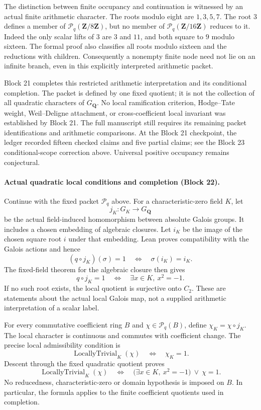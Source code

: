 \documentclass[11pt]{article}
\theoremstyle{definition}
\theoremstyle{remark}
\newcommand{\Z}{\mathbf Z}
\newcommand{\Q}{\mathbf Q}
\begin{document}
The distinction between finite occupancy and continuation is witnessed
by an actual finite arithmetic character. The roots modulo eight are
$1,3,5,7$. The root $3$ defines a member of
$\mathcal P_q(\Z/8\Z)$, but no member of
$\mathcal P_q(\Z/16\Z)$ reduces to it. Indeed the only scalar lifts of
$3$ are $3$ and $11$, and both square to $9$ modulo sixteen. The formal
proof also classifies all roots modulo sixteen and the reductions with
children. Consequently a nonempty finite node need not lie on an
infinite branch, even in this explicitly interpreted arithmetic packet.

Block 21 completes this restricted arithmetic interpretation and its
conditional completion. The packet is defined by one fixed quotient; it
is not the collection of all quadratic characters of $G_{\Q}$. No local
ramification criterion, Hodge--Tate weight, Weil--Deligne attachment, or
cross-coefficient local invariant was established by Block 21. The full
manuscript still requires its remaining packet identifications and
arithmetic comparisons. At the Block 21 checkpoint, the ledger recorded
fifteen checked claims and five partial claims; see the Block 23 conditional-scope
correction above. Universal positive occupancy remains conjectural.

\paragraph{Actual quadratic local conditions and completion (Block 22).}
Continue with the fixed packet $\mathcal P_q$ above. For a
characteristic-zero field $K$, let
\[
j_K:G_K\longrightarrow G_{\Q}
\]
be the actual field-induced homomorphism between absolute Galois groups.
It includes a chosen embedding of algebraic closures. Let $i_K$ be the
image of the chosen square root $i$ under that embedding. Lean proves
compatibility with the Galois actions and hence
\[
(q\circ j_K)(\sigma)=1
\quad\Longleftrightarrow\quad \sigma(i_K)=i_K.
\]
The fixed-field theorem for the algebraic closure then gives
\[
q\circ j_K=1
\quad\Longleftrightarrow\quad
\exists x\in K,\ x^2=-1.
\]
If no such root exists, the local quotient is surjective onto $C_2$.
These are statements about the actual local Galois map, not a supplied
arithmetic interpretation of a scalar label.

For every commutative coefficient ring $B$ and $\chi\in\mathcal P_q(B)$,
define $\chi_K=\chi\circ j_K$. The local character is continuous and
commutes with coefficient change. The precise local admissibility
condition is
\[
\operatorname{LocallyTrivial}_K(\chi)
\quad\Longleftrightarrow\quad \chi_K=1.
\]
Descent through the fixed quadratic quotient proves
\[
\operatorname{LocallyTrivial}_K(\chi)
\quad\Longleftrightarrow\quad
\bigl(\exists x\in K,\ x^2=-1\bigr)\ \lor\ \chi=1.
\]
No reducedness, characteristic-zero or domain hypothesis is imposed on
$B$. In particular, the formula applies to the finite coefficient
quotients used in completion.
\end{document}
